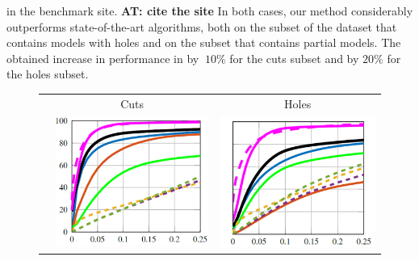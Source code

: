 \documentclass[10pt,twocolumn,letterpaper]{article}
\newcommand{\colornote}[3]{{\color{#1}\bf{#2: #3}\normalfont}}
\newcommand{\colornote}[3]{}
\newcommand {\ayellet}[1]{\colornote{blue}{AT}{#1}}
\begin{document}
in the benchmark site. \ayellet{cite the site}
In both cases, our method considerably outperforms state-of-the-art algorithms, both on the subset of the dataset that contains models with holes and on the subset that contains partial models.
The obtained increase in performance in by $~10\%$ for the cuts subset and by $20\%$ for the holes subset.

\begin{figure}[htb]
	\centering
		\setlength\tabcolsep{0.5pt}
	\begin{tabular}{ccc}
		& Cuts & Holes \\
		\rotatebox{90}{    \, \% Correspondences} &
		\includegraphics[scale=0.35]{figures/SHRECCutsCumulative16.png} & \includegraphics[scale=0.35]{figures/SHRECHolesCumulative16.png} \\

\end{tabular}
\end{figure}
\end{document}
